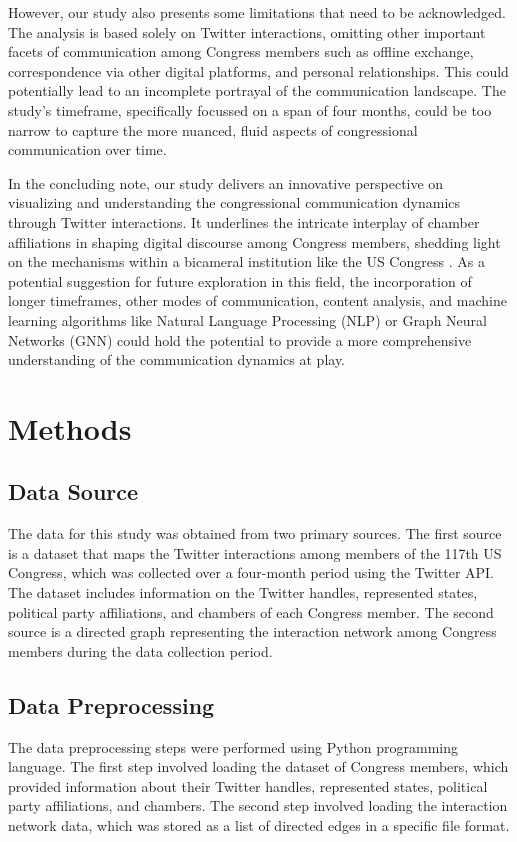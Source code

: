 \documentclass[11pt]{article}
\begin{document}
However, our study also presents some limitations that need to be acknowledged. The analysis is based solely on Twitter interactions, omitting other important facets of communication among Congress members such as offline exchange, correspondence via other digital platforms, and personal relationships. This could potentially lead to an incomplete portrayal of the communication landscape. The study's timeframe, specifically focussed on a span of four months, could be too narrow to capture the more nuanced, fluid aspects of congressional communication over time.

In the concluding note, our study delivers an innovative perspective on visualizing and understanding the congressional communication dynamics through Twitter interactions. It underlines the intricate interplay of chamber affiliations in shaping digital discourse among Congress members, shedding light on the mechanisms within a bicameral institution like the US Congress \cite{Lai2019TracingCP, Kenney2020COVID19AT}. As a potential suggestion for future exploration in this field, the incorporation of longer timeframes, other modes of communication, content analysis, and machine learning algorithms like Natural Language Processing (NLP) or Graph Neural Networks (GNN) \cite{Hllmann2019TheCO} could hold the potential to provide a more comprehensive understanding of the communication dynamics at play.

\section*{Methods}

\subsection*{Data Source}
The data for this study was obtained from two primary sources. The first source is a dataset that maps the Twitter interactions among members of the 117th US Congress, which was collected over a four-month period using the Twitter API. The dataset includes information on the Twitter handles, represented states, political party affiliations, and chambers of each Congress member. The second source is a directed graph representing the interaction network among Congress members during the data collection period.

\subsection*{Data Preprocessing}
The data preprocessing steps were performed using Python programming language. The first step involved loading the dataset of Congress members, which provided information about their Twitter handles, represented states, political party affiliations, and chambers. The second step involved loading the interaction network data, which was stored as a list of directed edges in a specific file format.
\end{document}
